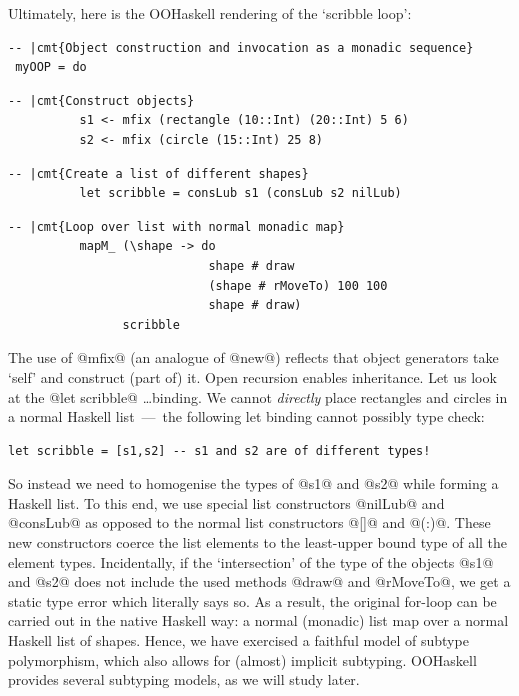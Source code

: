 \documentclass{jfp}
\begin{document}
\newpage

Ultimately, here is the OOHaskell rendering of the `scribble loop':

\begin{Verbatim}[fontsize=\small,commandchars=\|\{\}]
 -- |cmt{Object construction and invocation as a monadic sequence}
 myOOP = do
\end{Verbatim}

\begin{Verbatim}[fontsize=\small,commandchars=\|\{\}]
          -- |cmt{Construct objects}
          s1 <- mfix (rectangle (10::Int) (20::Int) 5 6)
          s2 <- mfix (circle (15::Int) 25 8)
\end{Verbatim}

\begin{Verbatim}[fontsize=\small,commandchars=\|\{\}]
          -- |cmt{Create a list of different shapes}
          let scribble = consLub s1 (consLub s2 nilLub)
\end{Verbatim}

\begin{Verbatim}[fontsize=\small,commandchars=\|\{\}]
          -- |cmt{Loop over list with normal monadic map}
          mapM_ (\shape -> do
                            shape # draw
                            (shape # rMoveTo) 100 100
                            shape # draw)
                scribble
\end{Verbatim}

The use of @mfix@ (an analogue of @new@) reflects that object
generators take `self' and construct (part of) it. Open recursion
enables inheritance. Let us look at the @let scribble@ \ldots binding.
We cannot \emph{directly} place rectangles and circles in a normal
Haskell list~---~the following let binding cannot possibly type check:

\begin{Verbatim}[fontsize=\small,commandchars=\|\{\}]
          let scribble = [s1,s2] -- s1 and s2 are of different types!
\end{Verbatim}

\noindent
So instead we need to homogenise the types of @s1@ and @s2@ while
forming a Haskell list. To this end, we use special list constructors
@nilLub@ and @consLub@ as opposed to the normal list constructors @[]@
and @(:)@. These new constructors coerce the list elements to the
least-upper bound type of all the element types. Incidentally, if the
`intersection' of the type of the objects @s1@ and @s2@ does not
include the used methods @draw@ and @rMoveTo@, we get a static type
error which literally says so. As a result, the original for-loop can
be carried out in the native Haskell way: a normal (monadic) list map
over a normal Haskell list of shapes. Hence, we have exercised a
faithful model of subtype polymorphism, which also allows for (almost)
implicit subtyping. OOHaskell provides several subtyping models, as we
will study later.
\end{document}
